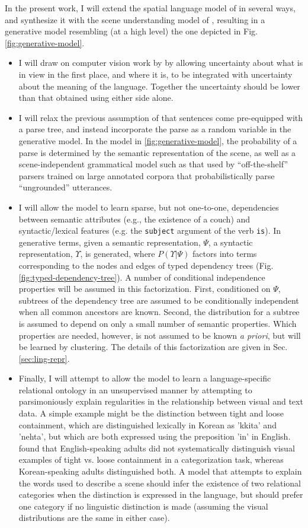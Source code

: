 \documentclass[12pt]{article}
\begin{document}
In the present work, I will extend the spatial language model of \cite{dawson2013spatial} in several ways, and synthesize it with the scene understanding model of \cite{delpero2012bayesian}, resulting in a generative model resembling (at a high level) the one depicted in Fig. \ref{fig:generative-model}.
\begin{itemize}
\item I will draw on computer vision work by \cite{delpero2011sampling,delpero2012bayesian} by allowing uncertainty about what is in view in the first place, and where it is, to be integrated with uncertainty about the meaning of the language.  Together the uncertainty should be lower than that obtained using either side alone.
\item I will relax the previous assumption of \cite{dawson2013spatial} that sentences come pre-equipped with a parse tree, and instead incorporate the parse as a random variable in the generative model.  In the model in \ref{fig:generative-model}, the probability of a parse is determined by the semantic representation of the scene, as well as a scene-independent grammatical model such as that used by ``off-the-shelf'' parsers trained on large annotated corpora that probabilistically parse ``ungrounded'' utterances.
\item I will allow the model to learn sparse, but not one-to-one, dependencies between semantic attributes (e.g., the existence of a couch) and syntactic/lexical features (e.g. the {\tt subject} argument of the verb {\tt is}).  In generative terms, given a semantic representation, $\Psi$, a syntactic representation, $\Upsilon$, is generated, where $P(\Upsilon \vert \Psi)$ factors into terms corresponding to the nodes and edges of typed dependency trees (Fig. \ref{fig:typed-dependency-tree}).  A number of conditional independence properties will be assumed in this factorization.  First, conditioned on $\Psi$, subtrees of the dependency tree are assumed to be conditionally independent when all common ancestors are known.  Second, the distribution for a subtree is assumed to depend on only a small number of semantic properties.  Which properties are needed, however, is not assumed to be known {\it a priori}, but will be learned by clustering.  The details of this factorization are given in Sec. \ref{sec:ling-repr}.
\item Finally, I will attempt to allow the model to learn a language-specific relational ontology in an unsupervised manner by attempting to parsimoniously explain regularities in the relationship between visual and text data.  A simple example might be the distinction between tight and loose containment, which are distinguished lexically in Korean as 'kkita' and 'nehta', but which are both expressed using the preposition 'in' in English.  \cite{mcdonough2003understanding} found that English-speaking adults did not systematically distinguish visual examples of tight vs. loose containment in a categorization task, whereas Korean-speaking adults distinguished both.  A model that attempts to explain the words used to describe a scene should infer the existence of two relational categories when the distinction is expressed in the language, but should prefer one category if no linguistic distinction is made (assuming the visual distributions are the same in either case).

\end{itemize}
\end{document}
